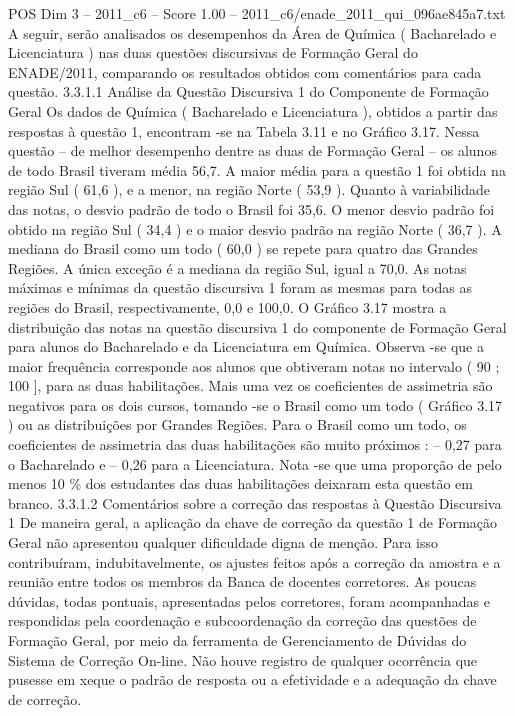 \begin{textsample}{POS Dim 3 – 2011\_c6 – Score 1.00 – 2011\_c6/enade\_2011\_qui\_096ae845a7.txt}
A seguir, serão analisados os desempenhos da Área de Química ( Bacharelado e Licenciatura ) nas duas questões discursivas de Formação Geral do ENADE/2011, comparando os resultados obtidos com comentários para cada questão. 3.3.1.1 Análise da Questão Discursiva 1 do Componente de Formação Geral Os dados de Química ( Bacharelado e Licenciatura ), obtidos a partir das respostas à questão 1, encontram -se na Tabela 3.11 e no Gráfico 3.17.
Nessa questão – de melhor desempenho dentre as duas de Formação Geral – os alunos de todo Brasil tiveram média 56,7.
A maior média para a questão 1 foi obtida na região Sul ( 61,6 ), e a menor, na região Norte ( 53,9 ).
Quanto à variabilidade das notas, o desvio padrão de todo o Brasil foi 35,6.
O menor desvio padrão foi obtido na região Sul ( 34,4 ) e o maior desvio padrão na região Norte ( 36,7 ).
A mediana do Brasil como um todo ( 60,0 ) se repete para quatro das Grandes Regiões.
A única exceção é a mediana da região Sul, igual a 70,0.
As notas máximas e mínimas da questão discursiva 1 foram as mesmas para todas as regiões do Brasil, respectivamente, 0,0 e 100,0.
O Gráfico 3.17 mostra a distribuição das notas na questão discursiva 1 do componente de Formação Geral para alunos do Bacharelado e da Licenciatura em Química.
Observa -se que a maior frequência corresponde aos alunos que obtiveram notas no intervalo ( 90 ; 100 ], para as duas habilitações.
Mais uma vez os coeficientes de assimetria são negativos para os dois cursos, tomando -se o Brasil como um todo ( Gráfico 3.17 ) ou as distribuições por Grandes Regiões.
Para o Brasil como um todo, os coeficientes de assimetria das duas habilitações são muito próximos : – 0,27 para o Bacharelado e – 0,26 para a Licenciatura.
Nota -se que uma proporção de pelo menos 10 \% dos estudantes das duas habilitações deixaram esta questão em branco. 3.3.1.2 Comentários sobre a correção das respostas à Questão Discursiva 1 De maneira geral, a aplicação da chave de correção da questão 1 de Formação Geral não apresentou qualquer dificuldade digna de menção.
Para isso contribuíram, indubitavelmente, os ajustes feitos após a correção da amostra e a reunião entre todos os membros da Banca de docentes corretores.
As poucas dúvidas, todas pontuais, apresentadas pelos corretores, foram acompanhadas e respondidas pela coordenação e subcoordenação da correção das questões de Formação Geral, por meio da ferramenta de Gerenciamento de Dúvidas do Sistema de Correção On-line.
Não houve registro de qualquer ocorrência que pusesse em xeque o padrão de resposta ou a efetividade e a adequação da chave de correção.

\end{textsample}
